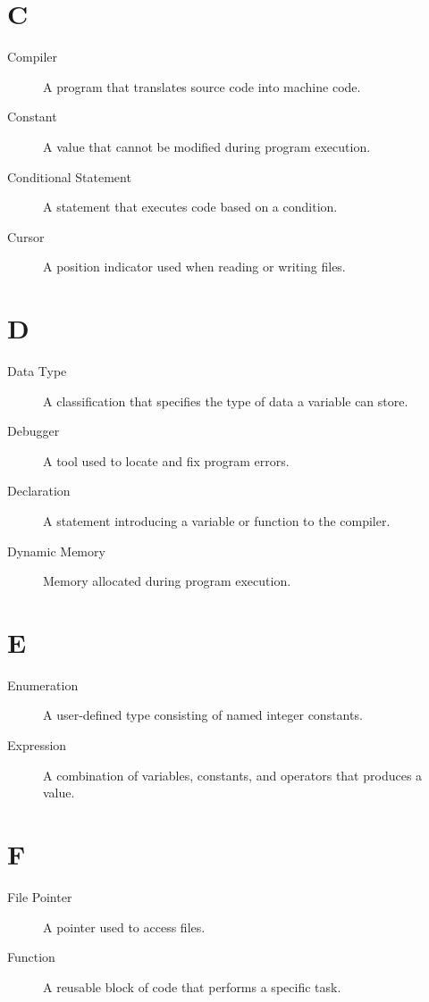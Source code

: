 \documentclass[12pt,openany]{book}
\begin{document}
\section*{C}

\begin{description}
    \item[Compiler] A program that translates source code into machine code.
    \item[Constant] A value that cannot be modified during program execution.
    \item[Conditional Statement] A statement that executes code based on a condition.
    \item[Cursor] A position indicator used when reading or writing files.
\end{description}

\section*{D}

\begin{description}
    \item[Data Type] A classification that specifies the type of data a variable can store.
    \item[Debugger] A tool used to locate and fix program errors.
    \item[Declaration] A statement introducing a variable or function to the compiler.
    \item[Dynamic Memory] Memory allocated during program execution.
\end{description}

\section*{E}

\begin{description}
    \item[Enumeration] A user-defined type consisting of named integer constants.
    \item[Expression] A combination of variables, constants, and operators that produces a value.
\end{description}

\section*{F}

\begin{description}
    \item[File Pointer] A pointer used to access files.
    \item[Function] A reusable block of code that performs a specific task.
\end{description}
\end{document}
